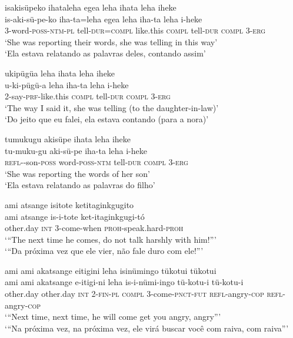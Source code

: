 \documentclass[output=paper,
modfonts,nonflat
]{langsci/langscibook}
\begin{document}
\ea isakisüpeko ihataleha egea leha ihata leha iheke \\[.3em]
\gll is-aki-sü-pe-ko iha-ta=leha egea leha iha-ta leha i-heke \\
3-word-\textsc{poss-ntm-pl} tell\textsc{-dur=compl} like.this \textsc{compl} tell\textsc{-dur} \textsc{compl} \textsc{3-erg} \\
\glt ‘She was reporting their words, she was telling in this way’ \\
‘Ela estava relatando as palavras deles, contando assim’ \\
\z

\ea ukipügüa leha ihata leha iheke \\[.3em]
\gll u-ki-pügü-a leha iha-ta leha i-heke \\
2-say-\textsc{prf}-like.this \textsc{compl} tell\textsc{-dur} \textsc{compl} 3\textsc{-erg} \\
\glt ‘The way I said it, she was telling (to the daughter-in-law)’ \\
‘Do jeito que eu falei, ela estava contando (para a nora)’ \\
\z


\ea tumukugu akisüpe ihata leha iheke \\[.3em]
\gll tu-muku-gu aki-sü-pe iha-ta leha i-heke \\
\textsc{refl-}-son-\textsc{poss} word\textsc{-poss-ntm} tell-\textsc{dur} \textsc{compl} \textsc{3-erg} \\
\glt ‘She was reporting the words of her son’ \\
‘Ela estava relatando as palavras do filho’ 
\z

 

\ea ami atsange isitote ketitaginkgugito \\[.3em]
\gll ami atsange is-i-tote ket-itaginkgugi-tó \\
other.day \textsc{int} 3-come-when \textsc{proh}-speak.hard\textsc{-proh} \\
\glt ‘“The next time he comes, do not talk harshly with him!”’ \\
‘“Da próxima vez que ele vier, não fale duro com ele!”’ \\
\z

\ea ami ami akatsange eitigini leha isinümingo tükotui tükotui \\[.3em]
\gll ami ami akatsange e-itigi-ni leha is-i-nümi-ingo tü-kotu-i tü-kotu-i \\
other.day other.day \textsc{int} \textsc{2-fin-pl} \textsc{compl} 3-come-\textsc{pnct-fut} \textsc{refl-}angry\textsc{-cop} \textsc{refl}-angry\textsc{-cop} \\
\glt ‘“Next time, next time, he will come get you angry, angry”’ \\
‘“Na próxima vez, na próxima vez, ele virá buscar você com raiva, com raiva”’ \\
 \z
\end{document}
